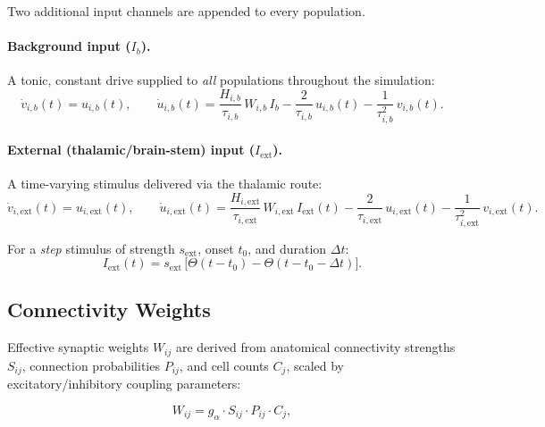 \documentclass[12pt, a4paper]{article}
\begin{document}
Two additional input channels are appended to every population.

\paragraph{Background input ($I_b$).}
A tonic, constant drive supplied to \emph{all} populations throughout the simulation:
\begin{equation}
    \dot{v}_{i,b}(t) = u_{i,b}(t), \qquad
    \dot{u}_{i,b}(t) = \frac{H_{i,b}}{\tau_{i,b}}\,W_{i,b}\,I_b
                       - \frac{2}{\tau_{i,b}}\,u_{i,b}(t)
                       - \frac{1}{\tau_{i,b}^2}\,v_{i,b}(t).
    \label{eq:bg}
\end{equation}

\paragraph{External (thalamic/brain-stem) input ($I_\text{ext}$).}
A time-varying stimulus delivered via the thalamic route:
\begin{equation}
    \dot{v}_{i,\text{ext}}(t) = u_{i,\text{ext}}(t), \qquad
    \dot{u}_{i,\text{ext}}(t) = \frac{H_{i,\text{ext}}}{\tau_{i,\text{ext}}}\,W_{i,\text{ext}}\,I_\text{ext}(t)
                                - \frac{2}{\tau_{i,\text{ext}}}\,u_{i,\text{ext}}(t)
                                - \frac{1}{\tau_{i,\text{ext}}^2}\,v_{i,\text{ext}}(t).
    \label{eq:ext}
\end{equation}

\noindent For a \emph{step} stimulus of strength $s_\text{ext}$, onset $t_0$, and
duration $\Delta t$:
\begin{equation}
    I_\text{ext}(t) = s_\text{ext}\,\bigl[\Theta(t-t_0) - \Theta(t-t_0-\Delta t)\bigr].
    \label{eq:Iext}
\end{equation}

\subsection{Connectivity Weights}

Effective synaptic weights $W_{ij}$ are derived from anatomical connectivity
strengths $S_{ij}$, connection probabilities $P_{ij}$, and cell counts $C_j$, scaled
by excitatory/inhibitory coupling parameters:

\begin{equation}
    W_{ij} = g_\alpha \cdot S_{ij} \cdot P_{ij} \cdot C_j,
    \label{eq:weights}
\end{equation}
\end{document}
